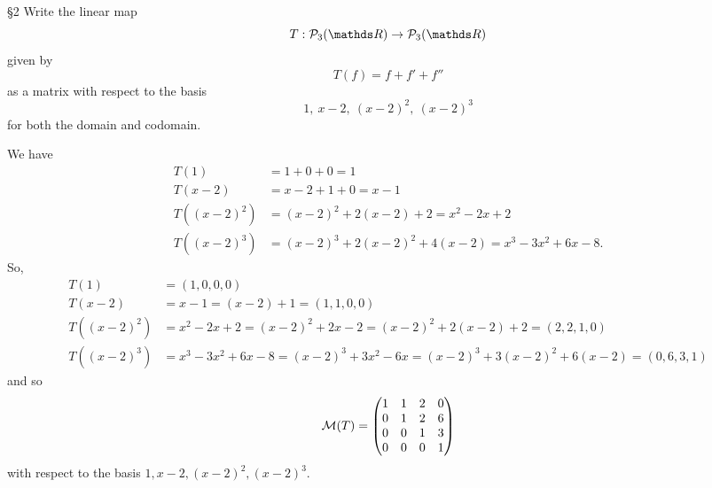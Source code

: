 \documentclass{review-sheet}
\begin{document}
\begin{problem}{\S 2}
  Write the linear map \[
    T:\mc{P}_3(\R)\to \mc{P}_3(\R)
  \] given by \[
    T(f) = f+f'+f''
  \] as a matrix with respect to the basis \[
    1,\ x-2,\ (x-2)^2,\ (x-2)^3
  \] for both the domain and codomain.
\end{problem}

\begin{solution}
  We have
  \begin{align*}
    T(1)&=1+0+0=1\\
    T(x-2)&=x-2+1+0=x-1\\
    T((x-2)^2)&= (x-2)^2+2(x-2)+2=x^2-2x+2 \\
    T((x-2)^3)&= (x-2)^3+2(x-2)^2+4(x-2)=x^3-3x^2+6x-8
  .\end{align*}
  So,
  \begin{align*}
    T(1) &= (1,0,0,0)\\
    T(x-2)&= x-1=(x-2)+1=(1,1,0,0) \\
    T((x-2)^2)&= x^2-2x+2=(x-2)^2+2x-2=(x-2)^2+2(x-2)+2=(2,2,1,0) \\
    T((x-2)^3)&= x^3-3x^2+6x-8=(x-2)^3+3x^2-6x=(x-2)^3+3(x-2)^2+6(x-2)=(0,6,3,1)
  \end{align*}
  and so \[
    \mathcal{M}(T)=\begin{pmatrix} 1&1&2&0\\0&1&2&6\\0&0&1&3\\0&0&0&1 \end{pmatrix} 
  \] with respect to the basis $1,x-2,(x-2)^2,(x-2)^3$.
\end{solution}
\end{document}
